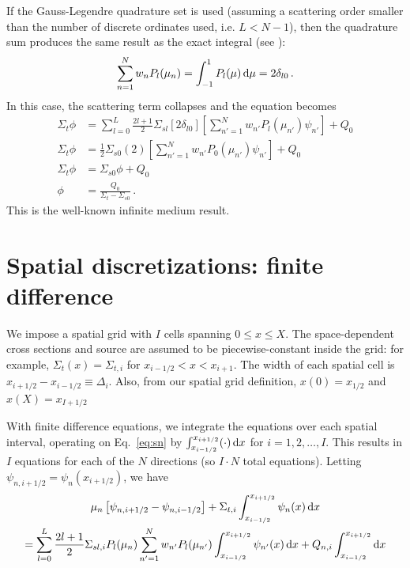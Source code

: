 \documentclass[11pt]{article}
\begin{document}
If the Gauss-Legendre quadrature set is used (assuming a scattering order
smaller than the number of discrete ordinates used, i.e. $L < N-1$),
then the quadrature sum
produces the same result as the exact integral (see \cite[p.121]{Lew1984}):
$$ \sum_{n=1}^{N} w_{n} P_{l}(\mu_n) 
= \int_{-1}^{1} P_l(\mu) \mathop{}\!\mathrm{d} \mu
= 2 \delta_{l0} \,.$$
In this case, the scattering term collapses and the equation becomes
\begin{align*}
  \Sigma_t \phi 
  &= \sum_{l=0}^{L}  \frac{2l+1}{2} \Sigma_{sl} \left[ 2 \delta_{l0} \right] \left[ \sum_{n'=1}^{N} w_{n'} P_{l} (\mu_{n'}) \psi_{n'}
\right] + Q_0
\\
  \Sigma_t \phi 
  &=  \frac{1}{2} \Sigma_{s0} (2) \left[ \sum_{n'=1}^{N} w_{n'} P_{0} (\mu_{n'}) \psi_{n'}
\right] + Q_0
\\
\Sigma_t \phi 
  &=  \Sigma_{s0} \phi + Q_0
\\
\phi 
&=  \frac{Q_0}{\Sigma_t - \Sigma_{s0}} \,.
\end{align*}
This is the well-known infinite medium result.
\section{Spatial discretizations: finite difference}
We impose a spatial grid with $I$ cells spanning $0 \le x \le X$. The
space-dependent cross sections and source are assumed to be piecewise-constant
inside the grid: for example, $\Sigma_t(x) = \Sigma_{t,i}$ for $x_{i-1/2} < x
< x_{i+1}$. The width of each spatial cell is $x_{i+1/2} - x_{i-1/2} \equiv
\Delta_i$. Also, from our spatial grid definition, $x(0) = x_{1/2}$ and $x(X) =
x_{I+1/2}$

With finite difference equations, we integrate the \SN{} equations over each
spatial interval, operating on Eq.~\eqref{eq:sn} by
$\int_{x_{i-1/2}}^{x_{i+1/2}} (\cdot) \mathop{}\!\mathrm{d} x$ for $i = 1,2,\ldots, I$.
This results in $I$ equations for each of the $N$ directions (so $I \cdot N$
total equations). Letting $\psi_{n,i+1/2} = \psi_n(x_{i+1/2})$, we have
\begin{multline}
  \mu_n \left[ \psi_{n,i+1/2} - \psi_{n,i-1/2} \right] + \Sigma_{t,i}
  \int_{x_{i-1/2}}^{x_{i+1/2}} \psi_n(x) \mathop{}\!\mathrm{d} x
\\
= \sum_{l=0}^{L}  \frac{2l+1}{2} \Sigma_{sl,i} P_{l}(\mu_n)
 \sum_{n'=1}^{N} w_{n'} P_{l} (\mu_{n'}) \int_{x_{i-1/2}}^{x_{i+1/2}} \psi_{n'}(x) \mathop{}\!\mathrm{d} x
  + Q_{n,i} \int_{x_{i-1/2}}^{x_{i+1/2}} \mathop{}\!\mathrm{d} x
  \label{eq:finitediff}
\end{multline}
\end{document}
